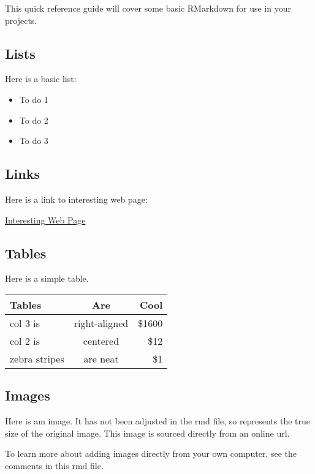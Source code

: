\documentclass[
]{article}
\begin{document}
This quick reference guide will cover some basic RMarkdown for use in
your projects.

\hypertarget{lists}{%
\subsection{Lists}\label{lists}}

Here is a basic list:

\begin{itemize}
\item
  To do 1
\item
  To do 2
\item
  To do 3
\end{itemize}

\hypertarget{links}{%
\subsection{Links}\label{links}}

Here is a link to interesting web page:

\href{https://www.ted.com/topics/visualizations}{Interesting Web Page}

\hypertarget{tables}{%
\subsection{Tables}\label{tables}}

Here is a simple table.

\begin{longtable}[]{@{}lcr@{}}
\toprule
Tables & Are & Cool \\
\midrule
\endhead
col 3 is & right-aligned & \$1600 \\
col 2 is & centered & \$12 \\
zebra stripes & are neat & \$1 \\
\bottomrule
\end{longtable}

\hypertarget{images}{%
\subsection{Images}\label{images}}

Here is am image. It has not been adjusted in the rmd file, so
represents the true size of the original image. This image is sourced
directly from an online url.

To learn more about adding images directly from your own computer, see
the comments in this rmd file.
\end{document}

